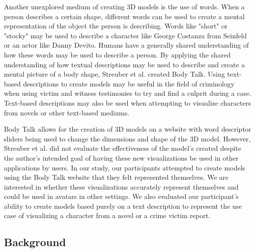 \documentclass[journal]{vgtc}                %
\begin{document}
\noindent Another unexplored medium of creating 3D models is the use of words. When a person describes a certain shape, different words can be used to
create a mental representation of the object the person is describing. Words like "short" or "stocky" may be used to describe a character
like George Costanza from Seinfeld or an actor like Danny Devito. Humans have a generally shared understanding of how these words may be used
to describe a person. By applying the shared understanding of how textual descriptions may be used to describe and create a mental picture of
a body shape, Streuber et al. created Body Talk\cite{Streuber:2016:SIGGRAPH}. Using text-based descriptions to create models may be useful
in the field of criminology when using victim and witness testimonies to try and find a culprit during a case. Text-based descriptions may
also be used when attempting to visualize characters from novels or other text-based mediums. \newline

\noindent Body Talk allows for the creation of 3D models on a website\cite{bodytalk:website} with word descriptor sliders being used to change the 
dimensions 
and shape of the 3D model. However, Streuber et al. did not evaluate the effectiveness of the model's created despite the author's intended goal
of having these new visualizations be used in other applications by users. In our study, our participants attempted to create models using
the Body Talk website that they felt represented themselves. We are interested in whether these visualizations accurately represent themselves
and could be used in avatars in other settings. We also evaluated our participant's ability to create models based purely on a text
description to represent the use case of visualizing a character from a novel or a crime victim report.

\subsection{Background}
\end{document}
